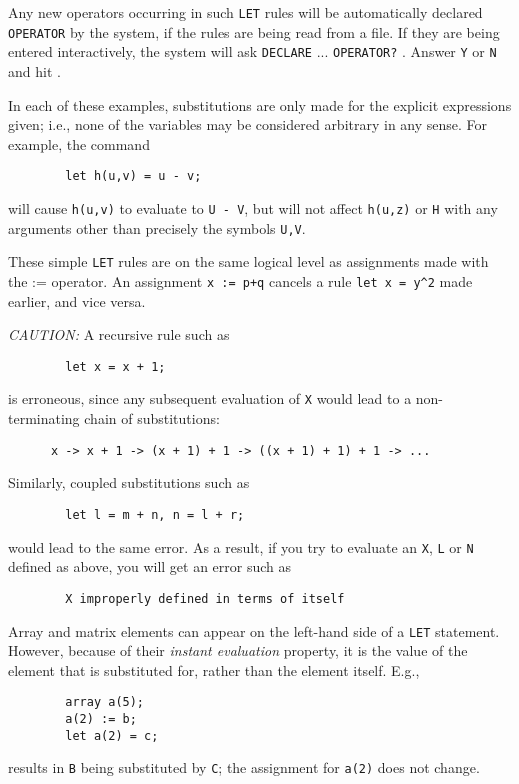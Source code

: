\documentclass[11pt,letterpaper]{book}
\newcommand{\key}[1]{\fbox{\sf #1}}
\begin{document}
Any new operators occurring in such {\tt LET} rules will be automatically
declared {\tt OPERATOR} by the system, if the rules are being read from a
file.  If they are being entered interactively, the system will ask
{\tt DECLARE} ... {\tt OPERATOR?} .  Answer {\tt Y} or {\tt N} and hit
\key{Return}.

In each of these examples, substitutions are only made for the explicit
expressions given; i.e., none of the variables may be considered arbitrary
in any sense. For example, the command
{\small\begin{verbatim}
        let h(u,v) = u - v;
\end{verbatim}}
will cause {\tt h(u,v)} to evaluate to {\tt U - V}, but will not affect
{\tt h(u,z)} or {\tt H} with any arguments other than precisely the
symbols {\tt U,V}.

These simple {\tt LET} rules are on the same logical level as assignments
made with the := operator.  An assignment {\tt x := p+q} cancels a rule
{\tt let x = y\verb|^|2} made earlier, and vice versa.

{\it CAUTION:} A recursive rule such as
{\small\begin{verbatim}
        let x = x + 1;
\end{verbatim}}
is erroneous, since any subsequent evaluation of {\tt X} would lead to a
non-terminating chain of substitutions:
{\small\begin{verbatim}
      x -> x + 1 -> (x + 1) + 1 -> ((x + 1) + 1) + 1 -> ...
\end{verbatim}}
Similarly, coupled substitutions such as
{\small\begin{verbatim}
        let l = m + n, n = l + r;
\end{verbatim}}
would lead to the same error. As a result, if you try to evaluate an {\tt X},
{\tt L} or {\tt N} defined as above, you will get an error such as
{\small\begin{verbatim}
        X improperly defined in terms of itself
\end{verbatim}}

Array and matrix elements can appear on the left-hand side of a {\tt LET}
statement. However, because of their {\em instant evaluation\/}
 property, it is the value of the element that
is substituted for, rather than the element itself.  E.g.,
{\small\begin{verbatim}
        array a(5);
        a(2) := b;
        let a(2) = c;
\end{verbatim}}
results in {\tt B} being substituted by {\tt C}; the assignment for
{\tt a(2)} does not change.
\end{document}

